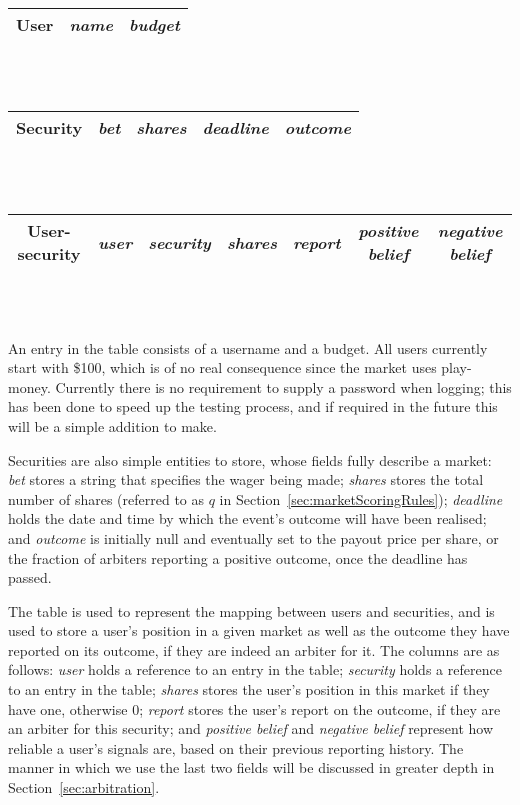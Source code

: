 \begin{table}[ht]
	\centering
	\begin{tabular}{|c|c|c|}
		\hline
		\textbf{User} & \emph{name} & \emph{budget} \\ \hline
	\end{tabular} \\~\\

	\begin{tabular}{|c|c|c|c|c|}
		\hline
		\textbf{Security} & \emph{bet} & \emph{shares} & \emph{deadline} &
		\emph{outcome} \\ \hline
	\end{tabular} \\~\\

	\begin{tabular}{|c|c|c|c|c|c|c|}
		\hline
		\textbf{User-security} & \emph{user} & \emph{security} & \emph{shares}
		& \emph{report} & \emph{positive belief} & \emph{negative belief} \\
		\hline
	\end{tabular} \\~\\
\end{table}

An entry in the  table consists of a username and a budget. All
users currently start with \$100, which is of no real consequence since the
market uses play-money. Currently there is no requirement to supply a password
when logging; this has been done to speed up the testing process, and if
required in the future this will be a simple addition to make.

Securities are also simple entities to store, whose fields fully describe a
market: \emph{bet} stores a string that specifies the wager being made;
\emph{shares} stores the total number of shares (referred to as $q$ in
Section~\ref{sec:marketScoringRules}); \emph{deadline} holds the date and time
by which the event's outcome will have been realised; and \emph{outcome} is
initially null and eventually set to the payout price per share, or the
fraction of arbiters reporting a positive outcome, once the deadline has
passed.

The  table is used to represent the mapping between users
and securities, and is used to store a user's position in a given market as
well as the outcome they have reported on its outcome, if they are indeed an
arbiter for it. The columns are as follows: \emph{user} holds a reference to an
entry in the  table; \emph{security} holds a reference to an entry
in the  table; \emph{shares} stores the user's position in this
market if they have one, otherwise 0; \emph{report} stores the user's report on
the outcome, if they are an arbiter for this security; and \emph{positive
belief} and \emph{negative belief} represent how reliable a user's signals are,
based on their previous reporting history. The manner in which we use the last
two fields will be discussed in greater depth in Section~\ref{sec:arbitration}.

